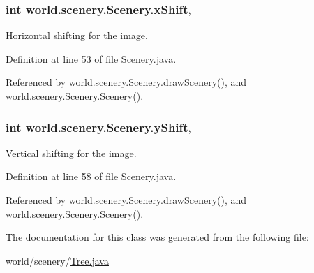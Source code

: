 \hypertarget{a00024_a0999f105f7630fd67fd9d440da6983aa}{
\subsubsection[{x\-Shift}]{\setlength{\rightskip}{0pt plus 5cm}int world.\-scenery.\-Scenery.\-x\-Shift\hspace{0.3cm}{\ttfamily [protected]}, {\ttfamily [inherited]}}}\label{a00024_a0999f105f7630fd67fd9d440da6983aa}


Horizontal shifting for the image. 



Definition at line 53 of file Scenery.\-java.



Referenced by world.\-scenery.\-Scenery.\-draw\-Scenery(), and world.\-scenery.\-Scenery.\-Scenery().

\hypertarget{a00024_ac9ca2c17cf6920deffe490c013b0e638}{
\subsubsection[{y\-Shift}]{\setlength{\rightskip}{0pt plus 5cm}int world.\-scenery.\-Scenery.\-y\-Shift\hspace{0.3cm}{\ttfamily [protected]}, {\ttfamily [inherited]}}}\label{a00024_ac9ca2c17cf6920deffe490c013b0e638}


Vertical shifting for the image. 



Definition at line 58 of file Scenery.\-java.



Referenced by world.\-scenery.\-Scenery.\-draw\-Scenery(), and world.\-scenery.\-Scenery.\-Scenery().



The documentation for this class was generated from the following file\-:\begin{DoxyCompactItemize}
\item 
world/scenery/\hyperlink{a00076}{Tree.\-java}\end{DoxyCompactItemize}
